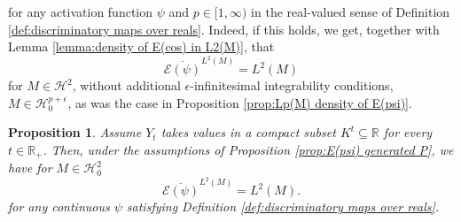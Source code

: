 \documentclass[11pt,a4paper,twoside,openany]{report}
\numberwithin{equation}{section}
\theoremstyle{plain} %
\newtheorem{proposition}[theorem]{Proposition}
\theoremstyle{definition} %
\theoremstyle{remark} %
\begin{document}
for any activation function \(\psi\) and \(p\in[1,\infty)\) in the real-valued sense of Definition \ref{def:discriminatory maps over reals}. Indeed, if this holds, we get, together with Lemma \ref{lemma:density of E(cos) in L2(M)}, that
\begin{equation*}
    \overline{\mathcal{E}(\psi)}^{L^2(M)}=L^2(M)
\end{equation*}
for \(M\in\mathcal{H}^2\), without additional \(\epsilon\)-infinitesimal integrability conditions, \(M\in\mathcal{H}_0^{p+\epsilon}\), as was the case in Proposition \ref{prop:Lp(M) density of E(psi)}.
\begin{proposition}\label{prop:density of E(psi) in L^2(M)}
    Assume \(Y_t\) takes values in a compact subset \(K^t\subseteq\mathbb{R}\) for every \(t\in\mathbb{R}_+\). Then, under the assumptions of Proposition \ref{prop:E(psi) generated P}, we have for \(M\in\mathcal{H}_0^2\)
    \begin{equation*}
        \overline{\mathcal{E}(\psi)}^{L^2(M)}=L^2(M).
    \end{equation*}
    for any continuous \(\psi\) satisfying Definition \ref{def:discriminatory maps over reals}.
\end{proposition}
\end{document}
